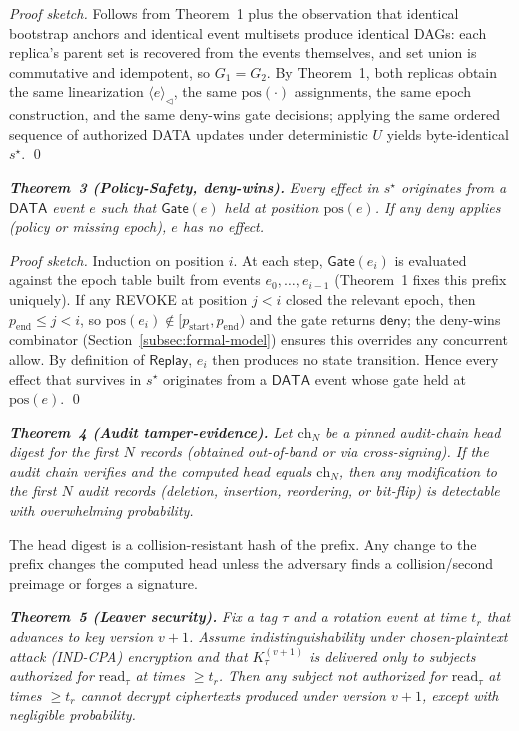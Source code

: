 \documentclass[10pt,journal,compsoc]{IEEEtran}
\begin{document}
\textit{Proof sketch.} Follows from Theorem~1 plus the observation that identical bootstrap anchors and identical event multisets produce identical DAGs: each replica's parent set is recovered from the events themselves, and set union is commutative and idempotent, so $G_1=G_2$. By Theorem~1, both replicas obtain the same linearization $\langle e\rangle_{\triangleleft}$, the same $\mathrm{pos}(\cdot)$ assignments, the same epoch construction, and the same deny-wins gate decisions; applying the same ordered sequence of authorized \textsc{DATA} updates under deterministic $U$ yields byte-identical $s^\star$. \qed


\noindent\textbf{\textit{Theorem~3 (Policy-Safety, deny-wins).}}
\textit{Every effect in $s^\star$ originates from a $\mathsf{DATA}$ event $e$ such that $\mathsf{Gate}(e)$ held at position $\mathrm{pos}(e)$.
If any deny applies (policy or missing epoch), $e$ has no effect.}


\textit{Proof sketch.} Induction on position $i$. At each step, $\mathsf{Gate}(e_i)$ is evaluated against the epoch table built from events $e_0,\dots,e_{i-1}$ (Theorem~1 fixes this prefix uniquely). If any \textsc{REVOKE} at position $j<i$ closed the relevant epoch, then $p_{\text{end}}\le j<i$, so $\mathrm{pos}(e_i)\notin[p_{\text{start}},p_{\text{end}})$ and the gate returns $\mathsf{deny}$; the deny-wins combinator (Section~\ref{subsec:formal-model}) ensures this overrides any concurrent allow. By definition of $\mathsf{Replay}$, $e_i$ then produces no state transition. Hence every effect that survives in $s^\star$ originates from a $\mathsf{DATA}$ event whose gate held at $\mathrm{pos}(e)$. \qed


\noindent\textbf{\textit{Theorem~4 (Audit tamper-evidence).}}
\textit{Let $\mathrm{ch}_N$ be a pinned audit-chain head digest for the first $N$ records (obtained out-of-band or via cross-signing). If the audit chain verifies and the computed head equals $\mathrm{ch}_N$, then any modification to the first $N$ audit records (deletion, insertion, reordering, or bit-flip) is detectable with overwhelming probability.}


The head digest is a collision-resistant hash of the prefix. Any change to the prefix changes the computed head unless the adversary finds a collision/second preimage or forges a signature.


\noindent\textbf{\textit{Theorem~5 (Leaver security).}}
\textit{Fix a tag $\tau$ and a rotation event at time $t_r$ that advances to key version $v{+}1$. Assume indistinguishability under chosen-plaintext attack (IND-CPA) encryption and that $K_{\tau}^{(v+1)}$ is delivered only to subjects authorized for $\mathrm{read}_\tau$ at times $\ge t_r$. Then any subject not authorized for $\mathrm{read}_\tau$ at times $\ge t_r$ cannot decrypt ciphertexts produced under version $v{+}1$, except with negligible probability.}
\end{document}
